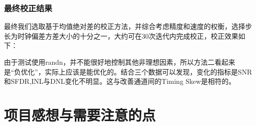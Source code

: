 \documentclass[cs4size,a4paper]{ctexart}
\numberwithin{equation}{section}
\numberwithin{table}{section}
\numberwithin{figure}{section}
\begin{document}
		\subsubsection{最终校正结果}
			最终我们选取基于均值绝对差的校正方法，并综合考虑精度和速度的权衡，选择步长为时钟偏差方差大小的十分之一，大约可在30次迭代内完成校正，校正效果如下：

		\begin{table}[H]
			\caption{矫正前后静态/动态参数指标统计}
		\end{table}

		由于测试使用randn，并不能很好地控制其他非理想因素，所以方法二看起来是“负优化”，实际上应该是能优化的。结合三个数据可以发现，变化的指标是SNR和SFDR,INL与DNL变化不明显。这与改善通道间的Timing Skew是相符的。

\newpage
		\section{项目感想与需要注意的点}
\end{document}
